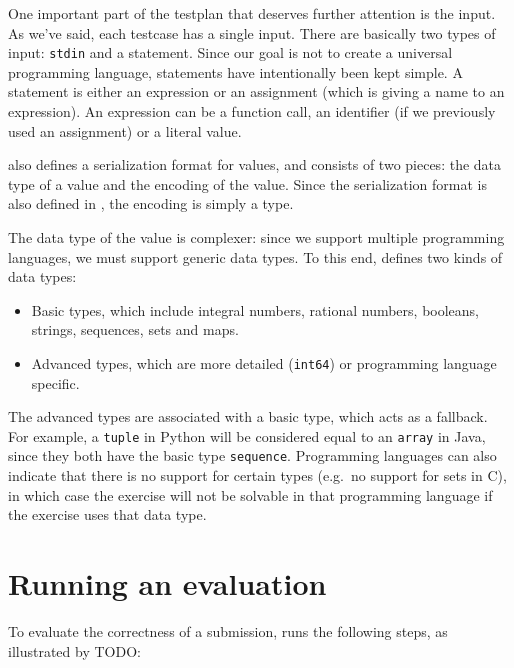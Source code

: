 \begin{multicols}{2}
    One important part of the testplan that deserves further attention is the input.
    As we've said, each testcase has a single input.
    There are basically two types of input: \texttt{stdin} and a statement.
    Since our goal is not to create a universal programming language, statements have intentionally been kept simple.
    A statement is either an expression or an assignment (which is giving a name to an expression).
    An expression can be a function call, an identifier (if we previously used an assignment) or a literal value.
    
    \tested{} also defines a serialization format for values, and consists of two pieces: the data type of a value and the encoding of the value.
    Since the serialization format is also defined in , the encoding is simply a  type.
    
    The data type of the value is complexer: since we support multiple programming languages, we must support generic data types.
    To this end, \tested{} defines two kinds of data types:
    
    \begin{itemize}
        \item Basic types, which include integral numbers, rational numbers, booleans, strings, sequences, sets and maps.
        \item Advanced types, which are more detailed (\texttt{int64}) or programming language specific.
    \end{itemize}
    
    The advanced types are associated with a basic type, which acts as a fallback.
    For example, a \texttt{tuple} in Python will be considered equal to an \texttt{array} in Java, since they both have the basic type \texttt{sequence}.
    Programming languages can also indicate that there is no support for certain types (e.g.\ no support for sets in C), in which case the exercise will not be solvable in that programming language if the exercise uses that data type.
    
    \section{Running an evaluation}\label{sec:running-an-evaluation}
    
    To evaluate the correctness of a submission, \tested{} runs the following steps, as illustrated by TODO:
    

\end{multicols}
